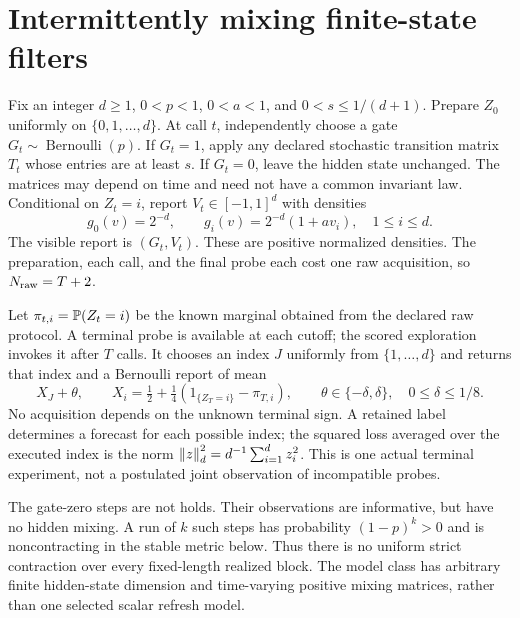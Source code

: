 \section{Intermittently mixing finite-state filters}\label{sec:filter}
Fix an integer $d\ge1$, $0<p<1$, $0<a<1$, and $0<s\le1/(d+1)$. Prepare $Z_0$ uniformly on $\{0,1,\ldots,d\}$. At call $t$, independently choose a gate $G_t\sim\operatorname{Bernoulli}(p)$. If $G_t=1$, apply any declared stochastic transition matrix $T_t$ whose entries are at least $s$. If $G_t=0$, leave the hidden state unchanged. The matrices may depend on time and need not have a common invariant law. Conditional on $Z_t=i$, report $V_t\in[-1,1]^d$ with densities
\begin{equation}\label{eq:filter-density}
 g_0(v)=2^{-d},\qquad g_i(v)=2^{-d}(1+av_i),\quad 1\le i\le d.
\end{equation}
The visible report is $(G_t,V_t)$. These are positive normalized densities. The preparation, each call, and the final probe each cost one raw acquisition, so $N_{\rm raw}=T+2$.

Let $\pi_{t,i}=\mathbb P(Z_t=i)$ be the known marginal obtained from the declared raw protocol. A terminal probe is available at each cutoff; the scored exploration invokes it after $T$ calls. It chooses an index $J$ uniformly from $\{1,\ldots,d\}$ and returns that index and a Bernoulli report of mean
\begin{equation}\label{eq:filter-task}
 X_J+\theta,\qquad X_i=\tfrac12+\tfrac14(1_{\{Z_T=i\}}-\pi_{T,i}),
 \qquad \theta\in\{-\delta,\delta\},\quad 0\le\delta\le1/8.
\end{equation}
No acquisition depends on the unknown terminal sign. A retained label determines a forecast for each possible index; the squared loss averaged over the executed index is the norm $\left\lVert z\right\rVert_d^2=d^{-1}\sum_{i=1}^d z_i^2$. This is one actual terminal experiment, not a postulated joint observation of incompatible probes.

The gate-zero steps are not holds. Their observations are informative, but have no hidden mixing. A run of $k$ such steps has probability $(1-p)^k>0$ and is noncontracting in the stable metric below. Thus there is no uniform strict contraction over every fixed-length realized block. The model class has arbitrary finite hidden-state dimension and time-varying positive mixing matrices, rather than one selected scalar refresh model.

